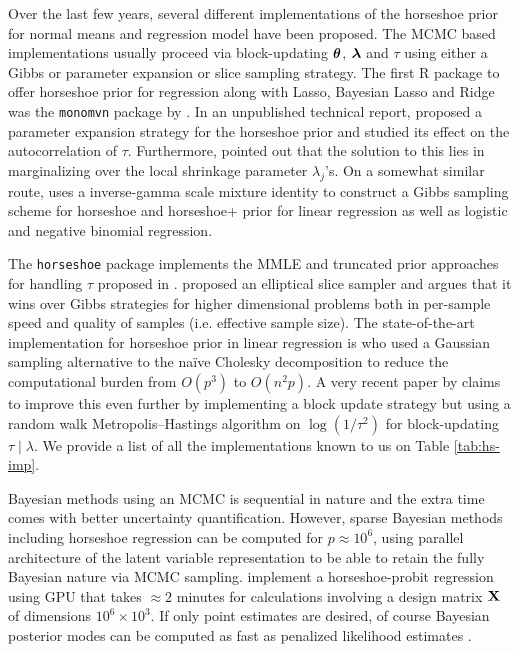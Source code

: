 \documentclass[sts,preprint]{imsart}
\begin{document}
Over the last few years, several different implementations of the horseshoe prior for normal means and regression model have been proposed. The MCMC based implementations usually proceed via block-updating $\boldsymbol{\theta}$, $\boldsymbol{\lambda}$ and $\tau$ using either a Gibbs or parameter expansion or slice sampling strategy. The first \textsc{R} package to offer horseshoe prior for regression along with Lasso, Bayesian Lasso and Ridge was the \texttt{monomvn} package by \citet{gramacy2010shrinkage}. In an unpublished technical report, \citet{scott_parameter_2010} proposed a parameter expansion strategy for the horseshoe prior and studied its effect on the autocorrelation of $\tau$. Furthermore, \citet{scott_parameter_2010} pointed out that the solution to this lies in marginalizing over the local shrinkage parameter $\lambda_j$'s. On a somewhat similar route, \citet{makalic2016high} uses a inverse-gamma scale mixture identity to construct a Gibbs sampling scheme for horseshoe and horseshoe+ prior for linear regression as well as logistic and negative binomial regression. 

The \texttt{horseshoe} package implements the MMLE and truncated prior approaches for handling $\tau$ proposed in \citet{van2017adaptive}. \citet{hahn_elliptical_2016} proposed an elliptical slice sampler and argues that it wins over Gibbs strategies for higher dimensional problems both in per-sample speed and quality of samples (i.e. effective sample size). The state-of-the-art implementation for horseshoe prior in linear regression is \citet{bhattacharya_fast_2015} who used a Gaussian sampling alternative to the na\"ive Cholesky decomposition to reduce the computational burden from $O(p^3)$ to $O(n^2p)$. A very recent paper by \citet{james2017scalable} claims to improve this even further by implementing a block update strategy but using a random walk Metropolis--Hastings algorithm on $\log(1/\tau^2)$ for block-updating $\tau \mid \lambda$. We provide a list of all the implementations known to us on Table \ref{tab:hs-imp}. 

Bayesian methods using an MCMC is sequential in nature and the extra time comes with better uncertainty quantification. However, sparse Bayesian methods including horseshoe regression can be computed for $p \approx 10^6$, using parallel architecture of the latent variable representation to be able to retain the  fully Bayesian nature via MCMC sampling. \cite{terenin_gpu-accelerated_2016} implement a horseshoe-probit regression using GPU that takes $\approx 2$ minutes for calculations involving a design matrix ${\bf X}$ of dimensions $10^6 \times 10^3$. If only point estimates are desired, of course Bayesian posterior modes can be computed as fast as penalized likelihood estimates \citep{bhadra2017horseshoe}.
\end{document}
